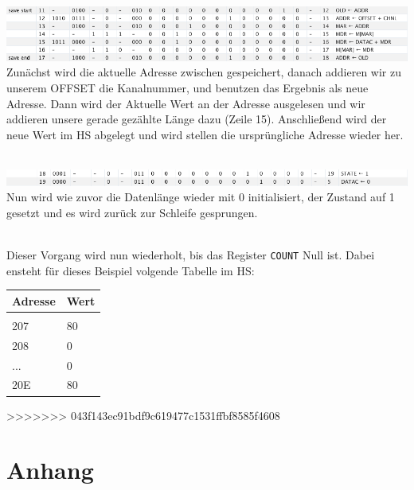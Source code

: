 \documentclass[12pt,titlepage]{article}
\begin{document}
\leavevmode \\
\includegraphics[width=16cm]{listing/row11-17.png}
\leavevmode \\

Zunächst wird die aktuelle Adresse zwischen gespeichert, danach addieren wir zu unserem OFFSET die Kanalnummer, und benutzen das Ergebnis
als neue Adresse. Dann wird der Aktuelle Wert an der Adresse ausgelesen und wir addieren unsere gerade gezählte Länge dazu (Zeile 15).
Anschließend wird der neue Wert im HS abgelegt und wird stellen die ursprüngliche Adresse wieder her.

\leavevmode \\
\includegraphics[width=16cm]{listing/row18-19.png}
\leavevmode \\

Nun wird wie zuvor die Datenlänge wieder mit 0 initialisiert, der Zustand auf 1 gesetzt und es wird zurück zur Schleife gesprungen.

\leavevmode \\

Dieser Vorgang wird nun wiederholt, bis das Register \texttt{COUNT} Null ist. Dabei ensteht für dieses Beispiel volgende Tabelle im HS:

\begin{table}[h!]
    \begin{tabular}{l|l}
    Adresse & Wert            \\
    \hline                    \\
    207   & 80       \\
    208   & 0        \\
    ...   & 0        \\
    20E   & 80       \\
    \end{tabular}
\end{table}

\newpage
>>>>>>> 043f143ec91bdf9c619477c1531ffbf8585f4608

\section{Anhang}
\end{document}
